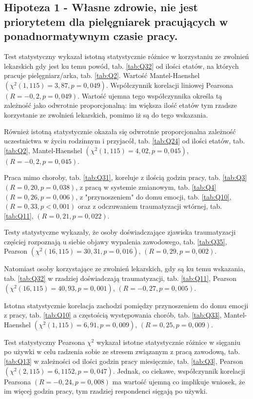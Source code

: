 \documentclass[a4paper,12pt,twoside,openright]{mwrep}
\begin{document}
\subsection* {Hipoteza 1 - Własne zdrowie, nie jest priorytetem dla pielęgniarek pracujących w ponadnormatywnym czasie pracy.}


Test statystyczny wykazał istotną statystycznie różnice w korzystaniu ze zwolnień lekarskich gdy jest ku temu powód, tab. \ref{tab:Q32} od ilości etatów,  na których pracuje pielęgniarz/arka, tab. \ref{tab:Q2}. Wartość Mantel-Haenshel $(\chi^2 (1, 115) = 3,87, p=0,049)$. Współczynnik korelacji liniowej Pearsona $(R = -0,2, p=0,049)$. Wartość ujemna tego współczynnika określa tą zależność jako odwrotnie proporcjonalną: im większa ilość etatów tym rzadsze korzystanie ze zwolnień lekarskich, pomimo iż są do tego wskazania.

Również istotną statystycznie okazała się odwrotnie proporcjonalna zależność uczestnictwa w życiu rodzinnym i przyjacół, tab. \ref{tab:Q24} od ilości etatów, tab. \ref{tab:Q2}, Mantel-Haenshel $(\chi^2 (1, 115) = 4,02, p=0,045)$, $(R = -0,2, p = 0,045)$. 

Praca mimo choroby, tab. \ref{tab:Q31}, koreluje z ilością godzin pracy, tab. \ref{tab:Q3} $(R = 0,20, p = 0,038)$, z pracą w systemie zmianowym, tab. \ref{tab:Q4} $(R = 0,26, p = 0,006)$, z "przynoszeniem" do domu emocji, tab. \ref{tab:Q10}, $(R = 0,33, p < 0,001)$ oraz z odczuwaniem traumatyzacji wtórnej, tab. \ref{tab:Q11}, $(R = 0,21, p = 0,022)$.

Testy statystyczne wykazały, że osoby doświadczające zjawiska traumatyzacji częściej rozpoznają u siebie objawy wypalenia zawodowego, tab. \ref{tab:Q35}, 
Pearson $(\chi^2 (16, 115) = 30,31, p=0,016)$, $(R = 0,29, p = 0,002)$.


Natomiast osoby korzystające ze zwolnień lekarskich, gdy są ku temu wskazania, tab. \ref{tab:Q32} w rzadziej doświadczają traumatyzacji, tab. \ref{tab:Q11}, Pearson $(\chi^2 (16, 115) = 40,93, p=0,001)$, $(R = -0,27, p = 0,005)$.


Istotna statystycznie korelacja zachodzi pomiędzy przynoszeniem do domu emocji z pracy, tab. \ref{tab:Q10} a częstością występowania chorób, tab. \ref{tab:Q33}, Mantel-Haenshel $(\chi^2 (1, 115) = 6,91, p=0,009)$, $(R = 0,25, p = 0,009)$.

Test statystyczny Pearsona $\chi^2$ wykazał istotne statystycznie różnice w sięganiu po używki w celu radzenia sobie ze stresem związanym z pracą zawodową, tab. \ref{tab:Q13} w zależności od ilości godzin pracy miesięcznie, tab. \ref{tab:Q3}, Pearson $(\chi^2 (2, 115) = 6,1152, p=0,047)$. Jednak, co ciekawe, współczynnik korelacji Pearsona $(R = -0,24, p = 0,008)$ ma wartość ujemną co implikuje wniosek, że im więcej godzin pracy, tym rzadziej respondenci sięgają po używki.
\end{document}
